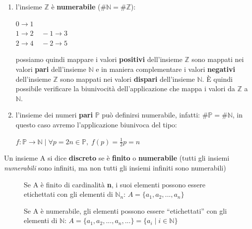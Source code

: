 \begin{enumerate}[nosep]
    \item l'insieme $\mathbb{Z}$ è \textbf{numerabile} ($\#\mathbb{N} = \#\mathbb{Z}$):
        \begin{center}
            $0 \rightarrow 1$ \\
            $1 \rightarrow 2 \;\;\;\; -1 \rightarrow 3$ \\
            $2 \rightarrow 4 \;\;\;\; -2 \rightarrow 5$
        \end{center}
    possiamo quindi mappare i valori \textbf{positivi} dell'insieme $\mathbb{Z}$ sono mappati nei valori \textbf{pari} dell'insieme $\mathbb{N}$ e in maniera complementare i valori \textbf{negativi} dell'insieme $\mathbb{Z}$ sono mappati nei valori \textbf{dispari} dell'insieme $\mathbb{N}$. È quindi possibile verificare la biunivocità dell'applicazione che mappa i valori da $\mathbb{Z}$ a $\mathbb{N}$.
    \item l'insieme dei numeri \textbf{pari} $\mathbb{P}$ può definirsi numerabile, infatti: $\#\mathbb{P} = \#\mathbb{N}$, in questo caso avremo l'applicazione biunivoca del tipo:
        \begin{center}
            $f : \mathbb{P} \rightarrow \mathbb{N} \; | \; \forall p = 2n \in \mathbb{P}, \; f(p) = \frac{1}{2}p = n$
        \end{center}
\end{enumerate}

\begin{boxA}
    Un insieme A si dice \textbf{discreto} se è \textbf{finito} o \textbf{numerabile} (tutti gli insiemi \textit{numerabili} sono infiniti, ma non tutti gli insiemi infiniti sono numerabili)
\end{boxA}
\begin{figure}[h]
    \begin{minipage}[t]{0.4\textwidth}
        \centering
        Se A è finito di cardinalità \textbf{n}, i suoi elementi possono essere etichettati con gli elementi di $\mathbb{N}_n$: $A = \{a_1, a_2, ..., a_n\}$
    \end{minipage}
    \begin{minipage}[t]{0.5\textwidth}
        \centering
        Se A è numerabile, gli elementi possono essere ``etichettati'' con gli elementi di $\mathbb{N}$: $A = \{a_1, a_2, ..., a_n, ...\} = \{a_i \; | \; i \in \mathbb{N} \}$
    \end{minipage}
\end{figure}

